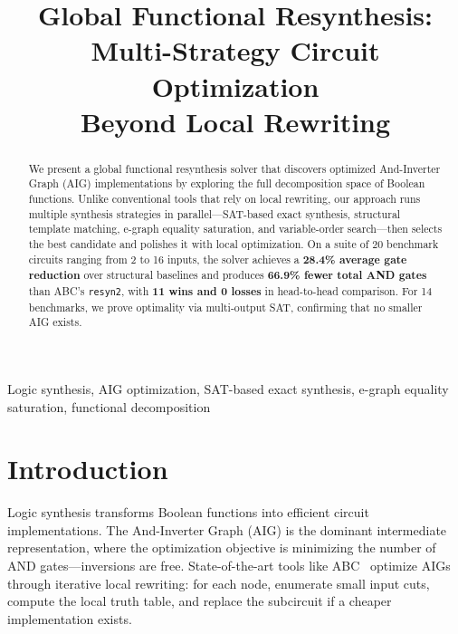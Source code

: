 \documentclass[conference,10pt]{IEEEtran}
\begin{document}
\title{Global Functional Resynthesis:\\Multi-Strategy Circuit Optimization\\Beyond Local Rewriting}

\author{
}

\maketitle

\begin{abstract}
We present a global functional resynthesis solver that discovers optimized And-Inverter Graph (AIG) implementations by exploring the full decomposition space of Boolean functions. Unlike conventional tools that rely on local rewriting, our approach runs multiple synthesis strategies in parallel---SAT-based exact synthesis, structural template matching, e-graph equality saturation, and variable-order search---then selects the best candidate and polishes it with local optimization. On a suite of 20 benchmark circuits ranging from 2 to 16 inputs, the solver achieves a \textbf{28.4\% average gate reduction} over structural baselines and produces \textbf{66.9\% fewer total AND gates} than ABC's \texttt{resyn2}, with \textbf{11 wins and 0 losses} in head-to-head comparison. For 14 benchmarks, we prove optimality via multi-output SAT, confirming that no smaller AIG exists.
\end{abstract}

\begin{IEEEkeywords}
Logic synthesis, AIG optimization, SAT-based exact synthesis, e-graph equality saturation, functional decomposition
\end{IEEEkeywords}

\section{Introduction}

Logic synthesis transforms Boolean functions into efficient circuit implementations. The And-Inverter Graph (AIG) is the dominant intermediate representation, where the optimization objective is minimizing the number of AND gates---inversions are free. State-of-the-art tools like ABC~\cite{abc} optimize AIGs through iterative local rewriting: for each node, enumerate small input cuts, compute the local truth table, and replace the subcircuit if a cheaper implementation exists.
\end{document}
